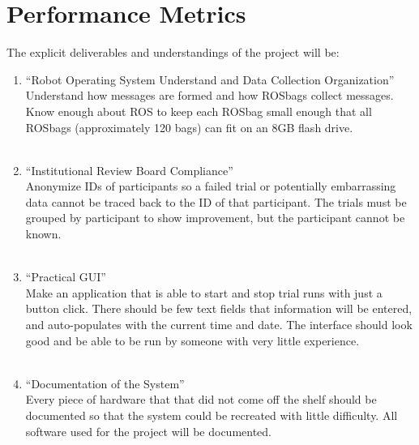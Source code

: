 \documentclass[onecolumn, draftclsnofoot,10pt, compsoc]{IEEEtran}
\begin{document}
\section{Performance Metrics}
	The explicit deliverables and understandings of the project will be:
\begin{enumerate}
	\item \large{“Robot Operating System Understand and Data Collection Organization”}
	\\
	\normalsize Understand how messages are formed and how ROSbags collect messages. Know enough about ROS to keep each ROSbag small enough that all ROSbags (approximately 120 bags) can fit on an 8GB flash drive.\\
	\\
	\item \large {“Institutional Review Board Compliance”}
	\\
	\normalsize Anonymize IDs of participants so a failed trial or potentially embarrassing data cannot be traced back to the ID of that participant. The trials must be grouped by participant to show improvement, but the participant cannot be known.\\
	\\
	\item \large {“Practical GUI”}
	\\
	\normalsize Make an application that is able to start and stop trial runs with just a button click. There should be few text fields that information will be entered, and auto-populates with the current time and date. The interface should look good and be able to be run by someone with very little experience.\\
	\\
	\item \large{“Documentation of the System”}
	\\
	\normalsize Every piece of hardware that that did not come off the shelf should be documented so that the system could be recreated with little difficulty. All software used for the project will be documented.\\
\end{enumerate}
\end{document}
